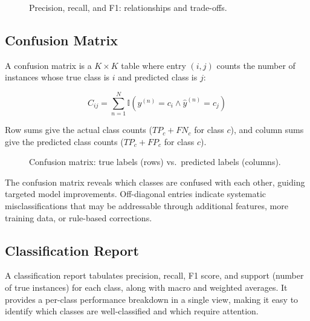 \documentclass[10pt,a4paper]{article}
\begin{document}
\begin{figure}[H]
    \centering
    \caption{Precision, recall, and F1: relationships and trade-offs.}
    \label{fig:precision-recall-f1}
\end{figure}

\subsection{Confusion Matrix}
\label{sec:confusion-matrix}

A confusion matrix is a $K \times K$ table where entry $(i, j)$ counts the number of instances whose true class is $i$ and predicted class is $j$:

\begin{equation}
C_{ij} = \sum_{n=1}^{N} \mathbb{I}(y^{(n)} = c_i \land \hat{y}^{(n)} = c_j)
\label{eq:confusion-matrix}
\end{equation}

Row sums give the actual class counts ($TP_c + FN_c$ for class $c$), and column sums give the predicted class counts ($TP_c + FP_c$ for class $c$).

\begin{figure}[H]
    \centering
    \caption{Confusion matrix: true labels (rows) vs.\ predicted labels (columns).}
    \label{fig:confusion-matrix}
\end{figure}

The confusion matrix reveals which classes are confused with each other, guiding targeted model improvements. Off-diagonal entries indicate systematic misclassifications that may be addressable through additional features, more training data, or rule-based corrections.

\subsection{Classification Report}
\label{sec:classification-report}

A classification report tabulates precision, recall, F1 score, and support (number of true instances) for each class, along with macro and weighted averages. It provides a per-class performance breakdown in a single view, making it easy to identify which classes are well-classified and which require attention.
\end{document}
